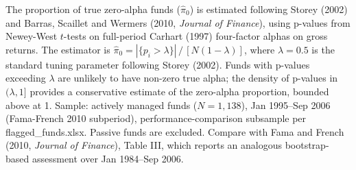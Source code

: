 \begin{table}[!htbp]
\centering
{}
\setlength{\tabletempwidth}{\wd\tabletempbox}
\ifdim\tabletempwidth>\linewidth\setlength{\tabletempwidth}{\linewidth}\fi
\begin{minipage}{\tabletempwidth}
\captionsetup{width=\linewidth}
\caption{\label{tab:pi0_estimate_FF}Aggregate Skill Estimate: Proportion of True Zero-Alpha Active Funds -- FF Subperiod}
\ifdim\wd\tabletempbox>\linewidth
  \resizebox{\linewidth}{!}{\usebox{\tabletempbox}}
\else
  \usebox{\tabletempbox}
\fi
\par\medskip
\begin{singlespace}\footnotesize\noindent
The proportion of true zero-alpha funds ($\hat{\pi}_0$) is estimated following Storey (2002) and Barras, Scaillet and Wermers (2010, \textit{Journal of Finance}), using p-values from Newey-West $t$-tests on full-period Carhart (1997) four-factor alphas on gross returns. The estimator is $\hat{\pi}_0 = |\{p_i > \lambda\}| \,/\, [N(1-\lambda)]$, where $\lambda = 0.5$ is the standard tuning parameter following Storey (2002). Funds with p-values exceeding $\lambda$ are unlikely to have non-zero true alpha; the density of p-values in $(\lambda, 1]$ provides a conservative estimate of the zero-alpha proportion, bounded above at 1. Sample: actively managed funds ($N = 1{,}138$), Jan 1995--Sep 2006 (Fama-French 2010 subperiod), performance-comparison subsample per flagged\_funds.xlsx. Passive funds are excluded. Compare with Fama and French (2010, \textit{Journal of Finance}), Table III, which reports an analogous bootstrap-based assessment over Jan 1984--Sep 2006.
\end{singlespace}
\end{minipage}
\end{table}

